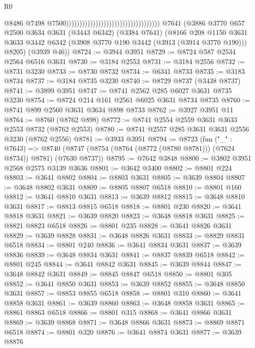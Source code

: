 \begin{lexlean}{R0}
\begin{coremodule}
                                                                          @8486
                                                                          @7498
                                                                          @7500)))))))))))))))))))))))))))))))))))
    @7641
    (@3886
      @3770
      @657
      @2500
      @3634
      @3631
      (@3443 @6342)
      (@3384 @7641)
      (@8166
        @208
        @1150
        @3631
        @3633
        @3442
        @6342
        (@3908 @3770 @190 @3442 (@3913 (@3914 @3770 @190)))
        @8205)
      (@3939 @46))
@8724 := @3944 @3951
@8729 := @8724 @587 @2534 @2564 @6516 @3631
@8730 := @3184 @2553
@8731 := @3184 @2556
@8732 := @8731 @3230
@8733 := @8730 @8732
@8734 := @6341 @8733
@8735 := @3183 @8734
@8737 := @3184 @8735 @3230
@8740 := @8729 @8737 (@3438 @8737)
@8741 := @3899 @3951
@8747 := @8741 @2562 @285 @6027 @3631 @8735 @3230
@8754 := @8724 @214 @161 @2561 @6025 @3631 @8734 @8735
@8760 := @8741 @899 @2560 @3631 @3634 @898 @8733
@8762 := @3927 @3951 @11
@8764 := @8760 (@8762 @898)
@8772 := @8741 @2554 @2559 @3631 @3633 @2553 @8732 (@8762 @2553)
@8780 := @8741 @2557 @285 @3631 @3631 @2556 @3230 (@8762 @2556)
@8781 := @3933 @3951
@8794 := @8723
    (fun ("_" : @7643) =>
    @8740 (@8747 (@8754 (@8764 (@8772 (@8780 @8781))) (@7624 @8734)) @8781) (@7630 @8737))
@8795 := @7642 @3848
@8800 := @3802 @3951 @2568 @2575 @3139 @3636
@8801 := @3642 @3400
@8802 := @8801 @224
@8803 := @3641 @8802
@8804 := @8803 @3631
@8805 := @3639 @8804
@8807 := @3648 @8802 @3631
@8809 := @8805 @8807 @6518
@8810 := @8801 @160
@8812 := @3641 @8810 @3631
@8813 := @3639 @8812
@8815 := @3648 @8810 @3631
@8817 := @8813 @8815 @6518
@8818 := @8801 @230
@8820 := @3641 @8818 @3631
@8821 := @3639 @8820
@8823 := @3648 @8818 @3631
@8825 := @8821 @8823 @6518
@8826 := @8801 @235
@8828 := @3641 @8826 @3631
@8829 := @3639 @8828
@8831 := @3648 @8826 @3631
@8833 := @8829 @8831 @6518
@8834 := @8801 @240
@8836 := @3641 @8834 @3631
@8837 := @3639 @8836
@8839 := @3648 @8834 @3631
@8841 := @8837 @8839 @6518
@8842 := @8801 @245
@8844 := @3641 @8842 @3631
@8845 := @3639 @8844
@8847 := @3648 @8842 @3631
@8849 := @8845 @8847 @6518
@8850 := @8801 @305
@8852 := @3641 @8850 @3631
@8853 := @3639 @8852
@8855 := @3648 @8850 @3631
@8857 := @8853 @8855 @6518
@8858 := @8801 @310
@8860 := @3641 @8858 @3631
@8861 := @3639 @8860
@8863 := @3648 @8858 @3631
@8865 := @8861 @8863 @6518
@8866 := @8801 @315
@8868 := @3641 @8866 @3631
@8869 := @3639 @8868
@8871 := @3648 @8866 @3631
@8873 := @8869 @8871 @6518
@8874 := @8801 @320
@8876 := @3641 @8874 @3631
@8877 := @3639 @8876

\end{coremodule}
\end{lexlean}
